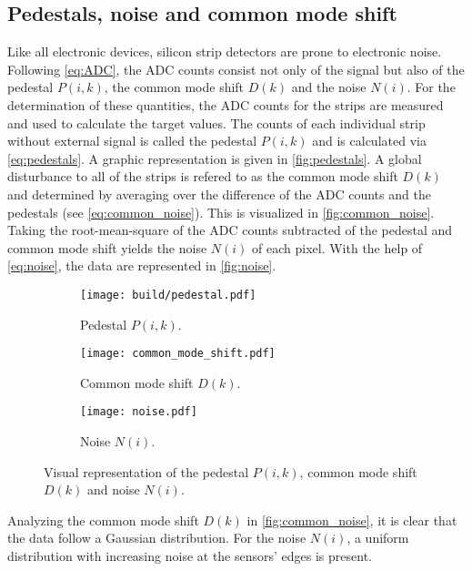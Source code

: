 \subsection{Pedestals, noise and common mode shift}
Like all electronic devices, silicon strip detectors are prone to electronic noise. Following \autoref{eq:ADC}, the ADC counts consist not only of the signal
but also of the pedestal $P(i,k)$, the common mode shift $D(k)$ and the noise $N(i)$. 
For the determination of these quantities, the ADC counts for the strips are measured and used to calculate the target values.
The counts of each individual strip without external signal is called the pedestal $P(i,k)$ and is calculated via \autoref{eq:pedestals}. A graphic representation
is given in \autoref{fig:pedestals}. 
A global disturbance to all of the strips is refered to as the common mode shift $D(k)$ and determined by averaging over the difference of the ADC counts and
the pedestals (see \autoref{eq:common_noise}). This is visualized in \autoref{fig:common_noise}.
Taking the root-mean-square of the ADC counts subtracted of the pedestal and common mode shift yields the noise $N(i)$ of each pixel. With the help of \autoref{eq:noise},
the data are represented in \autoref{fig:noise}.
\begin{figure}
    \centering
    \begin{subfigure}{0.7\textwidth}
      \texttt{[image: build/pedestal.pdf]}
      \caption{Pedestal $P(i,k)$.}
      \label{fig:pedestals}
    \end{subfigure}
    \hfill
    \begin{subfigure}{0.7\textwidth}
      \texttt{[image: common\_mode\_shift.pdf]}
      \caption{Common mode shift $D(k)$.}
      \label{fig:common_noise}
    \end{subfigure}
    \vfill
    \begin{subfigure}{0.7\textwidth}
        \texttt{[image: noise.pdf]}
        \caption{Noise $N(i)$.}
        \label{fig:noise}
      \end{subfigure}
    \caption{Visual representation of the pedestal $P(i,k)$, common mode shift~$D(k)$ and noise $N(i)$.}
    \label{fig:pedestal_etc}
  \end{figure}

Analyzing the common mode shift $D(k)$ in \autoref{fig:common_noise}, it is clear that the data follow a Gaussian distribution. For the noise $N(i)$, a uniform 
distribution with increasing noise at the sensors' edges is present.

